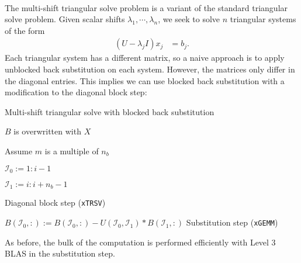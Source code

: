 \documentclass{article}
\begin{document}
\paragraph{}
The multi-shift triangular solve problem is a variant of the standard
triangular solve problem. Given scalar shifts
\(\lambda_1,\cdots,\lambda_n\),
we seek to solve \(n\) triangular systems of the form
\begin{align}
  \left(U-\lambda_j I\right) x_j &= b_j.
\end{align}
Each triangular system has a different matrix, so a naive approach is
to apply unblocked back substitution on each system. However, the
matrices only differ in the diagonal entries. This implies we can use
blocked back substitution with a modification to the diagonal block
step:
\begin{algorithm}[H]
  \caption{Multi-shift triangular solve with blocked back substitution}
  \label{algorithm:multi-shift trsm}
  \begin{algorithmic}
    \Comment \(B\) is overwritten with \(X\)

     \Comment Assume \(m\) is a multiple of
    \(n_b\)

    \State \( \mathcal{I}_0 := 1:i-1 \)

    \State \( \mathcal{I}_1 := i:i+n_b-1\)
    

    \State {} 
    \Comment Diagonal block step (\texttt{xTRSV})

    \EndFor

    \State \( B(\mathcal{I}_0,:) := B(\mathcal{I}_0,:) - U(\mathcal{I}_0,\mathcal{I}_1) * B(\mathcal{I}_1,:) \)
    \Comment Substitution step (\texttt{xGEMM})

    \EndFor

    \EndProcedure
  \end{algorithmic}
\end{algorithm}
\noindent
As before, the bulk of the computation is performed efficiently with
Level 3 BLAS in the substitution step.
\end{document}
